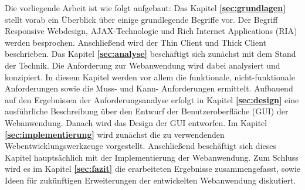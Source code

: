 Die vorliegende Arbeit ist wie folgt aufgebaut: Das Kapitel \textbf{\ref{sec:grundlagen}} stellt vorab ein Überblick über einige grundlegende Begriffe vor. Der Begriff Responsive Webdesign, AJAX-Technologie und Rich Internet Applications (RIA) werden besprochen. Anschließend wird der Thin Client und Thick Client beschrieben. Das Kapitel \textbf{\ref{sec:analyse}} beschäftigt sich zunächst mit dem Stand der Technik. Die Anforderung zur Webanwendung wird dabei analysiert und konzipiert. In diesem Kapitel werden vor allem die funktionale, nicht-funktionale Anforderungen sowie die Muss- und Kann- Anforderungen ermittelt. Aufbauend auf den Ergebnissen der Anforderungsanalyse erfolgt in Kapitel \textbf{\ref{sec:design}} eine ausführliche Beschreibung über den Entwurf der Benutzeroberfläche (GUI) der Webanwendung. Danach wird das Design der GUI entworfen. Im Kapitel \textbf{\ref{sec:implementierung}} wird zunächst die zu verwendenden Webentwicklungswerkzeuge vorgestellt. Anschließend beschäftigt sich dieses Kapitel hauptsächlich mit der Implementierung der Webanwendung. Zum Schluss wird es im Kapitel \textbf{\ref{sec:fazit}} die erarbeiteten Ergebnisse zusammengefasst, sowie Ideen für zukünftigen Erweiterungen der entwickelten Webanwendung diskutiert.
